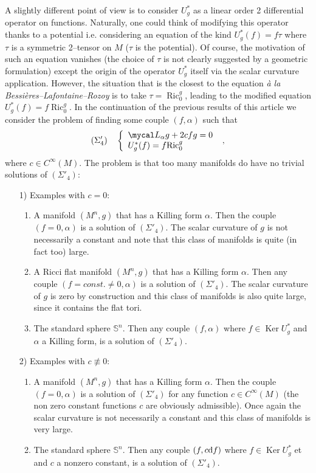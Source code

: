 \documentclass[a4paper,11pt,leqno]{amsart}
\numberwithin{equation}{section}
\theoremstyle{main}
\begin{document}
A slightly different point of view is to consider $U^*_g$ as a linear order 2 differential operator on functions. Naturally, one could think of modifying this operator thanks to a potential i.e. considering an equation of the kind $U^*_g(f)=f \tau$ where $\tau$ is a symmetric 2--tensor on $M$ ($\tau$ is the potential). Of course, the motivation of such an equation vanishes (the choice of $\tau$ is not clearly suggested by a geometric formulation) except the origin of the operator $U^*_g$ itself via the scalar curvature application. However, the situation that is the closest to the equation \textit{à la Bessières--Lafontaine--Rozoy} is to take $\tau={\operatorname{Ric}}_0^g$, leading to the modified equation $U^*_g(f)=f {\operatorname{Ric}}^g_0$. In the continuation of the previous results of this article we consider the problem of finding some couple $(f,\alpha)$ such that
$$(\Sigma'_4)\quad \left\{
\begin{array}{l}
	 \mycal L_\alpha g+ 2cfg= 0 \\
	 U_g^* (f)= f {\operatorname{Ric}}^g_0
\end{array}\right. \ ,  $$
where $c\in C^\infty (M)$. The problem is that too many manifolds do have no trivial solutions of $(\Sigma'_4)$:
\begin{enumerate}
	\item [1)] Examples with $c=0$:
\begin{enumerate}
	\item A manifold $(M^n,g)$ that has a Killing form $\alpha$. Then the couple ${(f=0,\alpha)}$ is a solution of $(\Sigma'_4)$. The scalar curvature of $g$ is not necessarily a constant and note that this class of manifolds is quite (in fact too) large.
	\item A Ricci flat manifold $(M^n,g)$ that has a Killing form $\alpha$. Then any couple $(f=const.\neq 0,\alpha)$ is a solution of $(\Sigma'_4)$. The scalar curvature of $g$ is zero by construction and this class of manifolds is also quite large, since it contains the flat tori.
	\item The standard sphere ${{\mathbb S^{n}}}$. Then any couple $(f,\alpha)$ where $f\in {\operatorname{Ker}} U^*_g$ and $\alpha$ a Killing form, is a solution of $(\Sigma'_4)$.
\end{enumerate}
	\item [2)] Examples with $c\not \equiv 0 $:
\begin{enumerate}
	\item A manifold $(M^n,g)$ that has a Killing form $\alpha$. Then the couple $(f=0,\alpha)$ is a solution of $(\Sigma'_4)$ for any function $c\in C^\infty (M)$ (the non zero constant functions $c$ are obviously admissible). Once again the scalar curvature is not necessarily a constant and this class of manifolds is very large.
	\item The standard sphere ${{\mathbb S^{n}}}$. Then any couple $(f,c {{\rm d}} f)$ where $f\in {\operatorname{Ker}} U^*_g$ et and $c$ a nonzero constant, is a solution of $(\Sigma'_4)$.
\end{enumerate}
\end{enumerate}
\end{document}
